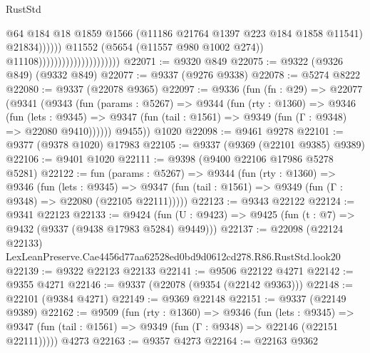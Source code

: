 \begin{lexlean}{RustStd}
\begin{coremodule}
                                                          @64
                                                          @184
                                                          @18
                                                          @1859
                                                          @1566
                                                          (@11186
                                                            @21764
                                                            @1397
                                                            @223
                                                            @184
                                                            @1858
                                                            @11541)
                                                          @21834))))))
                                              @11552
                                              (@5654 (@11557 @980 @1002 @274))
                                              @11108)))))))))))))))))))))
@22071 := @9320 @849
@22075 := @9322 (@9326 @849) (@9332 @849)
@22077 := @9337 (@9276 @9338)
@22078 := @5274 @8222
@22080 := @9337 (@22078 @9365)
@22097 := @9336
    (fun (fn : @29) =>
    @22077
      (@9341
        (@9343
          (fun (params : @5267) =>
          @9344
            (fun (rty : @1360) =>
            @9346
              (fun (lets : @9345) =>
              @9347 (fun (tail : @1561) => @9349 (fun (Γ : @9348) => @22080 @9410))))))
        @9455))
    @1020
@22098 := @9461 @9278
@22101 := @9377 (@9378 @1020) @17983
@22105 := @9337 (@9369 (@22101 @9385) @9389)
@22106 := @9401 @1020
@22111 := @9398 (@9400 @22106 @17986 @5278 @5281)
@22122 := fun (params : @5267) =>
  @9344
    (fun (rty : @1360) =>
    @9346
      (fun (lets : @9345) =>
      @9347 (fun (tail : @1561) => @9349 (fun (Γ : @9348) => @22080 (@22105 @22111)))))
@22123 := @9343 @22122
@22124 := @9341 @22123
@22133 := @9424
    (fun (U : @9423) => @9425 (fun (t : @7) => @9432 (@9337 (@9438 @17983 @5284) @9449)))
@22137 := @22098
    (@22124 @22133)
    LexLeanPreserve.Cae4456d77aa62528ed0bd9d0612cd278.R86.RustStd.look20
@22139 := @9322 @22123 @22133
@22141 := @9506 @22122 @4271
@22142 := @9355 @4271
@22146 := @9337 (@22078 (@9354 (@22142 @9363)))
@22148 := @22101 (@9384 @4271)
@22149 := @9369 @22148
@22151 := @9337 (@22149 @9389)
@22162 := @9509
    (fun (rty : @1360) =>
    @9346
      (fun (lets : @9345) =>
      @9347 (fun (tail : @1561) => @9349 (fun (Γ : @9348) => @22146 (@22151 @22111)))))
    @4273
@22163 := @9357 @4273
@22164 := @22163 @9362

\end{coremodule}
\end{lexlean}
